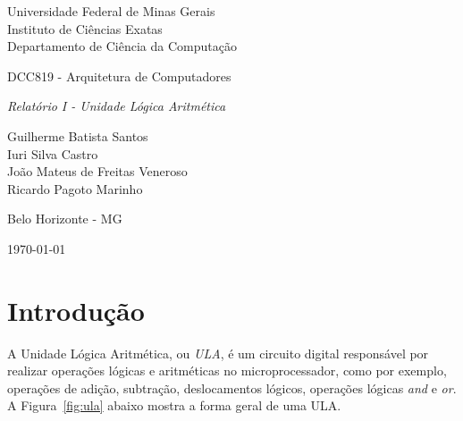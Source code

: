 \documentclass[11pt,a4paper,titlepage]{article}
\newcommand{\titulo}{\textit{Relatório I - Unidade Lógica Aritmética}}
\begin{document}
\begin{titlepage}
\begin{center}

\begin{large}
Universidade Federal de Minas Gerais\\
Instituto de Ciências Exatas\\
Departamento de Ciência da Computação\\
\end{large}

\vspace{20mm}

\begin{Large}
DCC819 - Arquitetura de Computadores
\end{Large}

\vspace{20mm}

\begin{LARGE}
\titulo
\end{LARGE}


\vspace{30mm}

\begin{Large}
\begin{center}
Guilherme Batista Santos\\ Iuri Silva Castro\\ João Mateus de Freitas Veneroso\\ Ricardo Pagoto Marinho \\
\end{center}
\end{Large}


\vspace{60mm}

{\sc Belo Horizonte - MG}

{\sc \today}

\end{center}
\end{titlepage}


\section{Introdução}\label{sec:intro}

A Unidade Lógica Aritmética, ou \textit{ULA}, é um circuito digital responsável por realizar operações lógicas e aritméticas no microprocessador, como por exemplo, operações de adição, subtração, deslocamentos lógicos, operações lógicas \textit{and} e \textit{or}. A Figura~\ref{fig:ula} abaixo mostra a forma geral de uma ULA.
\end{document}
